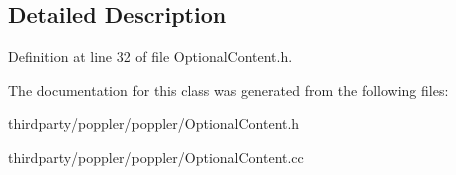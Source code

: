 \subsection{Detailed Description}


Definition at line 32 of file Optional\+Content.\+h.



The documentation for this class was generated from the following files\+:\begin{DoxyCompactItemize}
\item 
thirdparty/poppler/poppler/Optional\+Content.\+h\item 
thirdparty/poppler/poppler/Optional\+Content.\+cc\end{DoxyCompactItemize}
